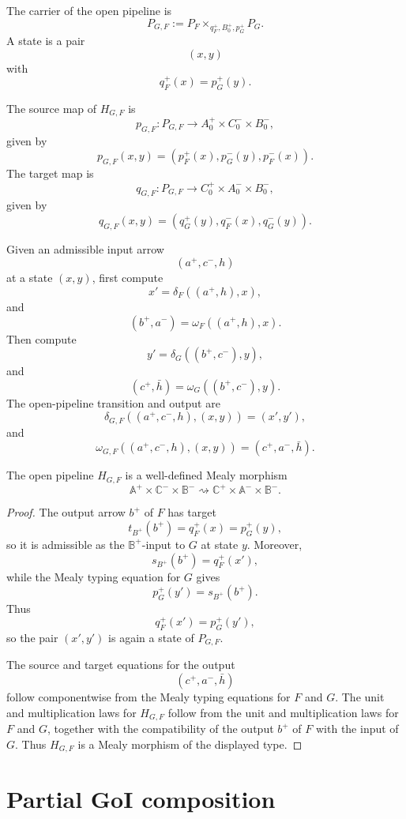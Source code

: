 The carrier of the open pipeline is
\[
P_{G,F}
:=
P_F\times_{q_F^+,B_0^+,p_G^+}P_G.
\]
A state is a pair
\[
(x,y)
\]
with
\[
q_F^+(x)=p_G^+(y).
\]

The source map of \(H_{G,F}\) is
\[
p_{G,F}:P_{G,F}\to A_0^+\times C_0^-\times B_0^-,
\]
given by
\[
p_{G,F}(x,y)
=
(p_F^+(x),p_G^-(y),p_F^-(x)).
\]
The target map is
\[
q_{G,F}:P_{G,F}\to C_0^+\times A_0^-\times B_0^-,
\]
given by
\[
q_{G,F}(x,y)
=
(q_G^+(y),q_F^-(x),q_G^-(y)).
\]

Given an admissible input arrow
\[
(a^+,c^-,h)
\]
at a state \((x,y)\), first compute
\[
x'
=
\delta_F((a^+,h),x),
\]
and
\[
(b^+,a^-)
=
\omega_F((a^+,h),x).
\]
Then compute
\[
y'
=
\delta_G((b^+,c^-),y),
\]
and
\[
(c^+,\bar h)
=
\omega_G((b^+,c^-),y).
\]
The open-pipeline transition and output are
\[
\delta_{G,F}((a^+,c^-,h),(x,y))
=
(x',y'),
\]
and
\[
\omega_{G,F}((a^+,c^-,h),(x,y))
=
(c^+,a^-,\bar h).
\]

\begin{proposition}
\label{prop:open-pipeline-well-defined}
The open pipeline \(H_{G,F}\) is a well-defined Mealy morphism
\[
\mathbb A^+\times\mathbb C^-\times\mathbb B^-
\rightsquigarrow
\mathbb C^+\times\mathbb A^-\times\mathbb B^-.
\]
\end{proposition}

\begin{proof}
The output arrow \(b^+\) of \(F\) has target
\[
t_{B^+}(b^+)=q_F^+(x)=p_G^+(y),
\]
so it is admissible as the \(\mathbb B^+\)-input to \(G\) at state \(y\).
Moreover,
\[
s_{B^+}(b^+)=q_F^+(x'),
\]
while the Mealy typing equation for \(G\) gives
\[
p_G^+(y')=s_{B^+}(b^+).
\]
Thus
\[
q_F^+(x')=p_G^+(y'),
\]
so the pair \((x',y')\) is again a state of \(P_{G,F}\).

The source and target equations for the output
\[
(c^+,a^-,\bar h)
\]
follow componentwise from the Mealy typing equations for \(F\) and \(G\).  The
unit and multiplication laws for \(H_{G,F}\) follow from the unit and
multiplication laws for \(F\) and \(G\), together with the compatibility of the
output \(b^+\) of \(F\) with the input of \(G\).  Thus \(H_{G,F}\) is a Mealy
morphism of the displayed type.
\end{proof}

\section{Partial GoI composition}
\label{sec:partial-goi-composition}

